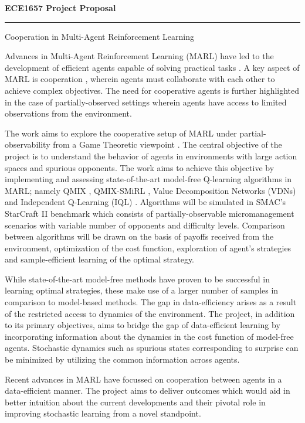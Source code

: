 \documentclass[10pt,letterpaper]{article}
\begin{document}
\begin{center}
  \textbf{\large ECE1657 Project Proposal}
\hrule

\end{center}


\begin{center}
  \large{Cooperation in Multi-Agent Reinforcement Learning}
\end{center}

\noindent Advances in Multi-Agent Reinforcement Learning (MARL) have led to the development of efficient agents capable of solving practical tasks \cite{overview}. A key aspect of MARL is cooperation \cite{cooperativemarl}, wherein agents must collaborate with each other to achieve complex objectives. The need for cooperative agents is further highlighted in the case of partially-observed settings wherein agents have access to limited observations from the environment.

\noindent The work aims to explore the cooperative setup of MARL under partial-observability from a Game Theoretic viewpoint \cite{book,egt}. The central objective of the project is to understand the behavior of agents in environments with large action spaces and spurious opponents. The work aims to achieve this objective by implementing and assessing state-of-the-art model-free Q-learning algorithms \cite{jakob} in MARL; namely QMIX \cite{qmix}, QMIX-SMiRL \cite{smirl}, Value Decomposition Networks (VDNs) \cite{vdn} and Independent Q-Learning (IQL) \cite{iql}. Algorithms will be simulated in SMAC's StarCraft II \cite{smac} benchmark which consists of partially-observable micromanagement scenarios with variable number of opponents and difficulty levels. Comparison between algorithms will be drawn on the basis of payoffs received from the environment, optimization of the cost function, exploration of agent's strategies and sample-efficient learning of the optimal strategy.

\noindent While state-of-the-art model-free methods have proven to be successful in learning optimal strategies, these make use of a larger number of samples in comparison to model-based methods. The gap in data-efficiency arises as a result of the restricted access to dynamics of the environment. The project, in addition to its primary objectives, aims to bridge the gap of data-efficient learning by incorporating information about the dynamics in the cost function of model-free agents. Stochastic dynamics such as spurious states corresponding to surprise can be minimized by utilizing the common information across agents. 

\noindent Recent advances in MARL have focussed on cooperation between agents in a data-efficient manner. The project aims to deliver outcomes which would aid in better intuition about the current developments and their pivotal role in improving stochastic learning from a novel standpoint. 


\small{}
\end{document}
